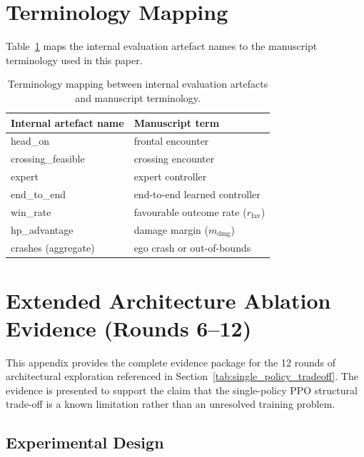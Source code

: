 \documentclass[drones,article,submit,pdftex,moreauthors]{Definitions/mdpi}
\begin{document}
\section{Terminology Mapping}

Table~\ref{tab:terminology} maps the internal evaluation artefact names to the manuscript terminology used in this paper.
\begin{table}[H]
\centering
\caption{Terminology mapping between internal evaluation artefacts and manuscript terminology.}
\label{tab:terminology}
\begin{tabular}{@{}ll@{}}
\toprule
Internal artefact name & Manuscript term \\
\midrule
head\_on & frontal encounter \\
crossing\_feasible & crossing encounter \\
expert & expert controller \\
end\_to\_end & end-to-end learned controller \\
win\_rate & favourable outcome rate ($r_{\mathrm{fav}}$) \\
hp\_advantage & damage margin ($m_{\mathrm{dmg}}$) \\
crashes (aggregate) & ego crash or out-of-bounds \\
\bottomrule
\end{tabular}
\end{table}
\section{Extended Architecture Ablation Evidence (Rounds 6--12)}

This appendix provides the complete evidence package for the 12 rounds of architectural exploration referenced in Section~\ref{tab:single_policy_tradeoff}. The evidence is presented to support the claim that the single-policy PPO structural trade-off is a known limitation rather than an unresolved training problem.

\subsection{Experimental Design}
\end{document}
